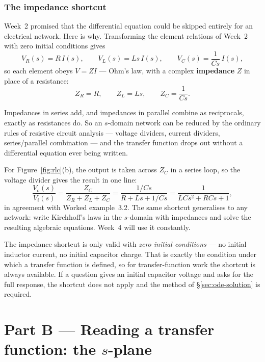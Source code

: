 \documentclass[11pt,a4paper]{article}
\begin{document}
\section{The impedance shortcut}
\label{sec:impedance}

Week~2 promised that the differential equation could be skipped entirely for an
electrical network. Here is why. Transforming the element relations of Week~2
with zero initial conditions gives
\[
  V_R(s) = R\,I(s), \qquad
  V_L(s) = Ls\,I(s), \qquad
  V_C(s) = \frac{1}{Cs}\,I(s),
\]
so each element obeys $V=ZI$ --- Ohm's law, with a complex \textbf{impedance}
$Z$ in place of a resistance:
\[
  Z_R = R, \qquad Z_L = Ls, \qquad Z_C = \frac{1}{Cs} .
\]

\begin{keyidea}
Impedances in series add, and impedances in parallel combine as reciprocals,
exactly as resistances do. So an $s$-domain network can be reduced by the
ordinary rules of resistive circuit analysis --- voltage dividers, current
dividers, series/parallel combination --- and the transfer function drops out
without a differential equation ever being written.
\end{keyidea}

For Figure~\ref{fig:rlc}(b), the output is taken across $Z_C$ in a series loop,
so the voltage divider gives the result in one line:
\[
  \frac{V_o(s)}{V_i(s)} = \frac{Z_C}{Z_R+Z_L+Z_C}
  = \frac{1/Cs}{R+Ls+1/Cs}
  = \frac{1}{LCs^{2}+RCs+1},
\]
in agreement with Worked example~3.2. The same shortcut generalises to any
network: write Kirchhoff's laws in the $s$-domain with impedances and solve the
resulting algebraic equations. Week~4 will use it constantly.

\begin{pitfall}
The impedance shortcut is only valid with \emph{zero initial conditions} ---
no initial inductor current, no initial capacitor charge. That is exactly the
condition under which a transfer function is defined, so for transfer-function
work the shortcut is always available. If a question gives an initial capacitor
voltage and asks for the full response, the shortcut does not apply and the
method of \S\ref{sec:ode-solution} is required.
\end{pitfall}

\part*{Part B --- Reading a transfer function: the $s$-plane}
\end{document}
